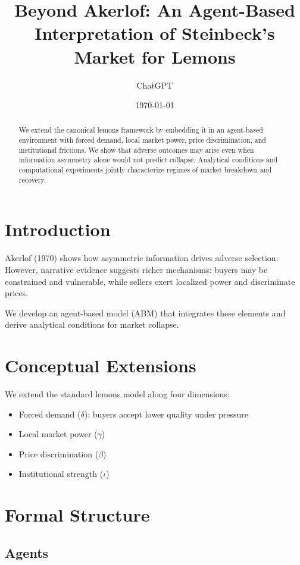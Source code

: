 \documentclass[12pt]{article}
\title{Beyond Akerlof: An Agent-Based Interpretation of Steinbeck’s Market for Lemons}
\author{ChatGPT}
\date{\today}
\begin{document}
\maketitle

\begin{abstract}
We extend the canonical lemons framework by embedding it in an agent-based environment with forced demand, local market power, price discrimination, and institutional frictions. We show that adverse outcomes may arise even when information asymmetry alone would not predict collapse. Analytical conditions and computational experiments jointly characterize regimes of market breakdown and recovery.
\end{abstract}

\section{Introduction}

Akerlof (1970) shows how asymmetric information drives adverse selection. However, narrative evidence suggests richer mechanisms: buyers may be constrained and vulnerable, while sellers exert localized power and discriminate prices.

We develop an agent-based model (ABM) that integrates these elements and derive analytical conditions for market collapse.

\section{Conceptual Extensions}

We extend the standard lemons model along four dimensions:

\begin{itemize}
    \item Forced demand ($\delta$): buyers accept lower quality under pressure
    \item Local market power ($\gamma$)
    \item Price discrimination ($\beta$)
    \item Institutional strength ($\iota$)
\end{itemize}

\section{Formal Structure}

\subsection{Agents}
\end{document}

